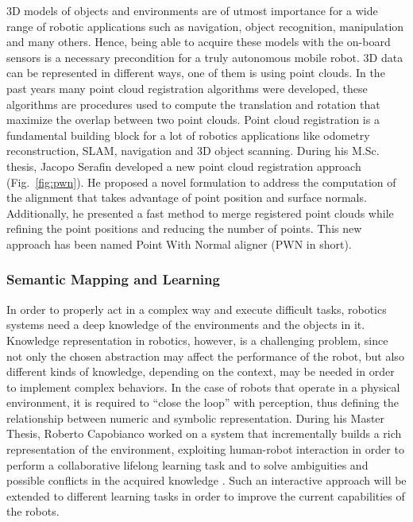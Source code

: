 \documentclass[conference]{IEEEtran}
\begin{document}
3D models of objects and environments are of utmost importance for a wide range of robotic applications such as navigation, object recognition, manipulation and many others. Hence, being able to acquire these models with the on-board sensors is a necessary precondition for a truly autonomous mobile robot. 3D data can be represented in different ways, one of them is using point clouds. In the past years many point cloud registration algorithms were developed, these algorithms are procedures used to compute the translation and rotation that maximize the overlap between two point clouds. Point cloud registration is a fundamental building block for a lot of robotics applications like odometry reconstruction, SLAM, navigation and 3D object scanning. During his M.Sc. thesis, Jacopo Serafin developed a new point cloud registration approach (Fig.~\ref{fig:pwn}). He proposed a novel formulation to address the computation of the alignment that takes advantage of point position and surface normals. Additionally, he presented a fast method to merge registered point clouds while refining the point positions and reducing the number of points. This new approach has been named Point With Normal aligner (PWN in short).   

\subsubsection{Semantic Mapping and Learning}\label{sec:semantic_map}
In order to properly act in a complex way and execute difficult tasks, robotics systems need a deep knowledge of the environments and the objects in it. Knowledge representation in robotics, however, is a challenging problem, since not only the chosen abstraction may affect the performance of the robot, but also different kinds of knowledge, depending on the context, may be needed in order to implement complex behaviors. In the case of robots that operate in a physical environment, it is required to “close the loop” with perception, thus defining the relationship between numeric and symbolic representation. During his Master Thesis, Roberto Capobianco worked on a system that incrementally builds a rich representation of the environment, exploiting human-robot interaction in order to perform a collaborative lifelong learning task and to solve ambiguities and possible conflicts in the acquired knowledge \cite{bastianelli2013line}\cite{bastianelliBCGIN13}. Such an interactive approach will be extended to different learning tasks in order to improve the current capabilities of the robots.
\end{document}
